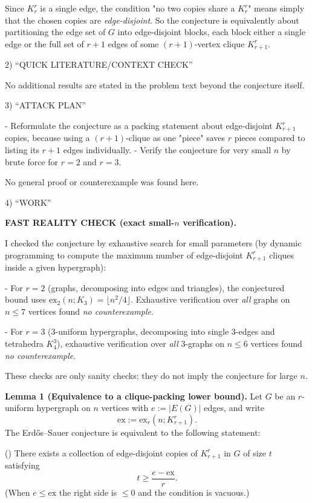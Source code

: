 Since $K_r^r$ is a single edge, the condition "no two copies share a $K_r^r$" means simply that the chosen copies are \emph{edge-disjoint}.
So the conjecture is equivalently about partitioning the edge set of $G$ into edge-disjoint blocks, each block either a single edge or the full set of $r+1$ edges of some $(r+1)$-vertex clique $K_{r+1}^r$.

2) “QUICK LITERATURE/CONTEXT CHECK”

No additional results are stated in the problem text beyond the conjecture itself.

3) “ATTACK PLAN”

- Reformulate the conjecture as a packing statement about edge-disjoint $K_{r+1}^r$ copies, because using a $(r+1)$-clique as one "piece" saves $r$ pieces compared to listing its $r+1$ edges individually.
- Verify the conjecture for very small $n$ by brute force for $r=2$ and $r=3$.

No general proof or counterexample was found here.

4) “WORK”

\textbf{FAST REALITY CHECK (exact small-$n$ verification).}

I checked the conjecture by exhaustive search for small parameters (by dynamic programming to compute the maximum number of edge-disjoint $K_{r+1}^r$ cliques inside a given hypergraph):

- For $r=2$ (graphs, decomposing into edges and triangles), the conjectured bound uses $\mathrm{ex}_2(n;K_3)=\lfloor n^2/4\rfloor$.
Exhaustive verification over \emph{all} graphs on $n\le 7$ vertices found \emph{no counterexample}.

- For $r=3$ (3-uniform hypergraphs, decomposing into single 3-edges and tetrahedra $K_4^3$), exhaustive verification over \emph{all} 3-graphs on $n\le 6$ vertices found \emph{no counterexample}.

These checks are only sanity checks; they do not imply the conjecture for large $n$.

\medskip
\textbf{Lemma 1 (Equivalence to a clique-packing lower bound).}
Let $G$ be an $r$-uniform hypergraph on $n$ vertices with $e:=|E(G)|$ edges, and write
\[
\mathrm{ex}:=\mathrm{ex}_r(n;K_{r+1}^r).
\]
The Erd\H{o}s--Sauer conjecture is equivalent to the following statement:

(\*) There exists a collection of edge-disjoint copies of $K_{r+1}^r$ in $G$ of size $t$ satisfying
\[
 t \ge \frac{e-\mathrm{ex}}{r}.
\]
(When $e\le \mathrm{ex}$ the right side is $\le 0$ and the condition is vacuous.)

